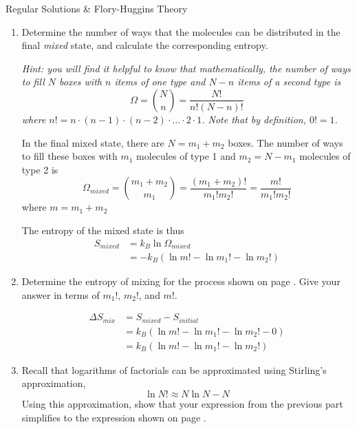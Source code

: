 \begin{activity}{Regular Solutions \& Flory-Huggins Theory}
\begin{exercises}
\begin{enumerate}
				\item Determine the number of ways that the molecules can be distributed in the final \emph{mixed} state, and calculate the corresponding entropy.
				
					\emph{Hint: you will find it helpful to know that mathematically, the number of ways to fill $N$ boxes with $n$ items of one type and $N-n$ items of a second type is}
	\begin{equation*}
		\Omega = {N \choose n} = \frac{N!}{n!(N-n)!}
	\end{equation*}
	\emph{where $n! = n\cdot(n-1)\cdot(n-2)\cdot\dots\cdot 2 \cdot 1$.	Note that by definition, $0!=1$.}
				
					\begin{solution}{}
						In the final mixed state, there are $N=m_1+m_2$ boxes.  The number of ways to fill these boxes with $m_1$ molecules of type 1 and $m_2=N-m_1$ molecules of type 2 is
						\begin{equation*}
							\Omega_{mixed} = {{m_1+m_2} \choose m_1} = \frac{(m_1+m_2)!}{m_1! m_2!} = \frac{m!}{m_1! m_2!} 
						\end{equation*}
						where $m=m_1+m_2$
						
						The entropy of the mixed state is thus
						\begin{align*}
							S_{mixed} &= k_B \ln \Omega_{mixed}\\
							&= -k_B(\ln m! - \ln m_1! - \ln m_2!)
						\end{align*}
					
					\end{solution}
	
				\item Determine the entropy of mixing for the process shown on page \pageref{\labelbase:eqn:idealS}.  Give your answer in terms of $m_1!$, $m_2!$, and $m!$.
				
					\begin{solution}{}
						\begin{align*}
							\Delta S_{mix} &= S_{mixed} - S_{initial}\\
							 &= k_B(\ln m! - \ln m_1! - \ln m_2! - 0) \\
							 &= k_B(\ln m! - \ln m_1! - \ln m_2!)
						\end{align*}
					
					\end{solution}
				
				\item Recall that logarithms of factorials can be approximated using Stirling's approximation,
	\begin{equation*}
		\ln N! \approx N \ln N - N \label{eqn:stirling}
	\end{equation*}
					Using this approximation, show that your expression from the previous part simplifies to the expression shown on page \pageref{\labelbase:eqn:idealS}.
				

\end{enumerate}
\end{exercises}
\end{activity}
